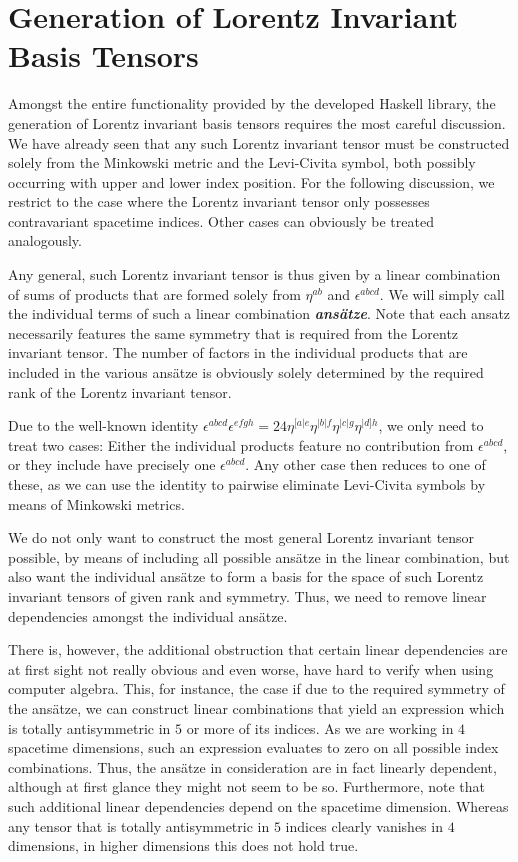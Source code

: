 \section{Generation of Lorentz Invariant Basis Tensors}\label{LorentzGen}
Amongst the entire functionality provided by the developed Haskell library, the generation of Lorentz invariant basis tensors requires the most careful discussion. We have already seen that any such Lorentz invariant tensor must be constructed solely from the Minkowski metric and the Levi-Civita symbol, both possibly occurring with upper and lower index position. For the following discussion, we restrict to the case where the Lorentz invariant tensor only possesses contravariant spacetime indices. Other cases can obviously be treated analogously.

Any general, such Lorentz invariant tensor is thus given by a linear combination of sums of products that are formed solely from $\eta^{ab}$ and $\epsilon^{abcd}$.
We will simply call the individual terms of such a linear combination \textit{\textbf{ansätze}}. Note that each ansatz necessarily features the same symmetry that is required from the Lorentz invariant tensor. The number of factors in the individual products that are included in the various ansätze is obviously solely determined by the required rank of the Lorentz invariant tensor.

Due to the well-known identity $\epsilon^{abcd}\epsilon^{efgh} = 24 \eta^{[a\vert e}\eta^{\vert b \vert f}\eta^{\vert c \vert g}\eta^{\vert d] h}$, we only need to treat two cases: Either the individual products feature  no contribution from $\epsilon^{abcd}$, or they include have precisely one $\epsilon^{abcd}$. Any other case then reduces to one of these, as we can use the identity to pairwise eliminate Levi-Civita symbols by means of Minkowski metrics. 

We do not only want to construct the most general Lorentz invariant tensor possible, by means of including all possible ansätze in the linear combination, but also want the individual ansätze to form a basis for the space of such Lorentz invariant tensors of given rank and symmetry. Thus, we need to remove linear dependencies amongst the individual ansätze. 

There is, however, the additional obstruction that certain linear dependencies are at first sight not really obvious and even worse, have hard to verify  when using computer algebra. This, for instance, the case if due to the required symmetry of the ansätze, we can construct linear combinations that yield an expression which is totally antisymmetric in $5$ or more of its indices. As we are working in $4$ spacetime dimensions, such an expression evaluates to zero on all possible index combinations. Thus, the ansätze in consideration are in fact linearly dependent, although at first glance they might not seem to be so. 
Furthermore, note that such additional linear dependencies depend on the spacetime dimension. Whereas any tensor that is totally antisymmetric in $5$ indices clearly vanishes in $4$ dimensions, in higher dimensions this does not hold true.  


